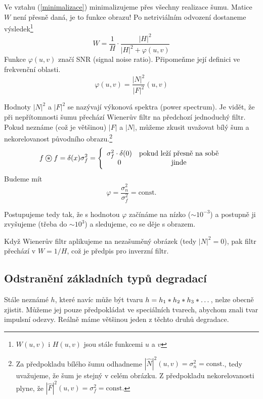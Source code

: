 Ve vztahu (\ref{minimalizace}) minimalizujeme přes všechny realizace šumu. Matice $W$ není přesně daná, je to funkce obrazu!
Po netriviálním odvození dostaneme výsledek\footnote{$ W (u,v) $ i $ H (u,v) $ jsou stále funkcemi $ u$ a $v $}
\begin{equation}
W = \frac{1}{H}\cdot\frac{|H|^2}{|H|^2+\varphi(u,v)}
\end{equation}
Funkce $\varphi(u,v)$ značí SNR (signal noise ratio). Připomeňme její definici ve frekvenční oblasti.
\begin{equation}
\varphi (u,v) = \frac{|N|^2}{|F|^2} (u,v)
\end{equation}

Hodnoty $|N|^2$ a $|F|^2$ se nazývají výkonová spektra (power spectrum). Je vidět, že při nepřítomnosti šumu 
přechází Wienerův filtr na předchozí jednoduchý filtr. Pokud neznáme (což je většinou) $|F|$ a $|N|$, můžeme zkusit
uvažovat bílý šum a nekorelovanost původního obrazu.\footnote{ Za předpokladu bílého šumu odhadneme $ |\hat{N}|^2 (u,v) = \sigma^2_n = \text{const.} $, tedy uvažujeme, že šum je stejný v celém obrázku. Z předpokladu nekorelovanosti plyne, že $ |\hat{F}|^2 (u,v) = \sigma^2_f = \text{const.} $ }
\begin{equation}
 f\corr f = \delta(x)\sigma_f^2=\left\{\begin{array}{cc}\sigma_f^2\cdot\delta(0)&\hbox{pokud leží přesně na sobě}\\0&\hbox{jinde}\end{array}\right.
\end{equation}
Budeme mít
\begin{equation}
\varphi = \frac{\sigma_n^2}{\sigma_f^2} = \text{const.}
\end{equation}

Postupujeme tedy tak, že s hodnotou $\varphi$ začínáme na nízko ($\sim 10^{-3}$) a postupně ji zvyšujeme (třeba do $ \sim 10^3 $) a sledujeme, co se děje s obrazem. 

Když Wienerův filtr aplikujeme na nezašuměný obrázek (tedy $ |N|^2 = 0 $), pak filtr přechází v $ W = 1/H $, což je předpis pro inverzní filtr.

\subsection{Odstranění základních typů degradací}

Stále neznámé $h$, které navíc může být tvaru $h=h_1\ast h_2\ast h_3 \ast \dots$, nelze obecně zjistit. Můžeme jej
pouze předpokládat ve speciálních tvarech, abychom znali tvar impulsní odezvy. Reálně máme většinou jeden z těchto druhů degradace.

